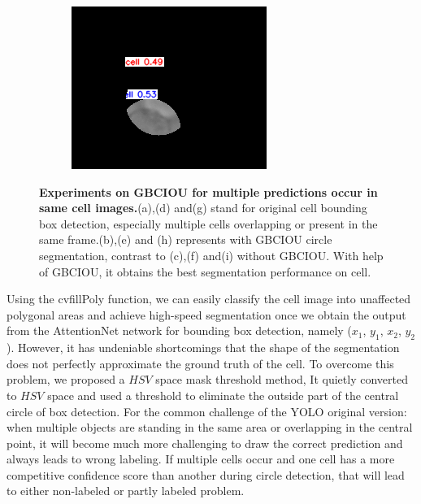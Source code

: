 \begin{figure}[h]
\begin{center}
\begin{subfigure}[b]{0.25\textwidth}
		\end{subfigure}
		\begin{subfigure}[b]{0.25\textwidth}
		    \centering
			\includegraphics[width=\textwidth]{thesis-template-master/images/gbciou12.png}
			\caption{}
			\label{fig:cellnet}
		\end{subfigure}
	\end{center}
	\caption{\textbf{Experiments on GBCIOU for multiple predictions occur in same cell images.}(a),(d) and(g) stand for original cell bounding box detection, especially multiple cells overlapping or present in the same frame.(b),(e) and (h) represents with  GBCIOU circle segmentation, contrast to (c),(f) and(i) without GBCIOU. With help of GBCIOU, it obtains the best segmentation performance on cell.}
	\label{fig:3.5}
\end{figure}

Using the cvfillPoly function, we can easily classify the cell image into unaffected polygonal areas and achieve high-speed segmentation once we obtain the output from the AttentionNet network for bounding box detection, namely ($x_{1}$, $y_{1}$, $x_{2}$, $y_{2}$). However, it has undeniable shortcomings that the shape of the segmentation does not perfectly approximate the ground truth of the cell. To overcome this problem, we proposed a $ HSV $ space mask threshold method, It quietly converted to $ HSV $ space and used a threshold to eliminate the outside part of the central circle of box detection.  For the common challenge of the YOLO original version\cite{yolov1}: when multiple objects are standing in the same area or overlapping in the central point, it will become much more challenging to draw the correct prediction and always leads to wrong labeling. If multiple cells occur and one cell has a more competitive confidence score than another during circle detection, that will lead to either non-labeled or partly labeled problem.

